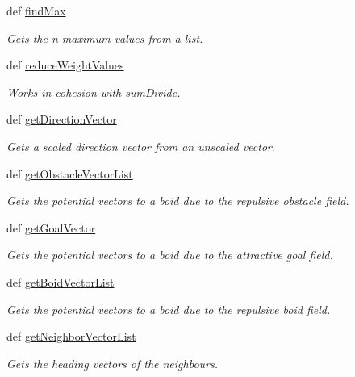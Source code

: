 \begin{DoxyCompactItemize}
def \hyperlink{classboid_1_1Boid_a3467de3698a644a484ff63a3e86f7adc}{find\-Max}
\begin{DoxyCompactList}\small\item\em Gets the n maximum values from a list. \end{DoxyCompactList}\item 
def \hyperlink{classboid_1_1Boid_a2d4f1cded412a333857bb1b8b17d3dd0}{reduce\-Weight\-Values}
\begin{DoxyCompactList}\small\item\em Works in cohesion with sum\-Divide. \end{DoxyCompactList}\item 
def \hyperlink{classboid_1_1Boid_a8aa203db69671a064a623a88dfc6b3b7}{get\-Direction\-Vector}
\begin{DoxyCompactList}\small\item\em Gets a scaled direction vector from an unscaled vector. \end{DoxyCompactList}\item 
def \hyperlink{classboid_1_1Boid_a2c496bdcc16d7db82cc0f730ce3d5264}{get\-Obstacle\-Vector\-List}
\begin{DoxyCompactList}\small\item\em Gets the potential vectors to a boid due to the repulsive obstacle field. \end{DoxyCompactList}\item 
def \hyperlink{classboid_1_1Boid_a47c28705553bd3d729212944880161d3}{get\-Goal\-Vector}
\begin{DoxyCompactList}\small\item\em Gets the potential vectors to a boid due to the attractive goal field. \end{DoxyCompactList}\item 
def \hyperlink{classboid_1_1Boid_a353fbe920fabe58a43affaf183cfcd03}{get\-Boid\-Vector\-List}
\begin{DoxyCompactList}\small\item\em Gets the potential vectors to a boid due to the repulsive boid field. \end{DoxyCompactList}\item 
def \hyperlink{classboid_1_1Boid_aa7ef63f7cc5adfdeb565c56f359b07cd}{get\-Neighbor\-Vector\-List}
\begin{DoxyCompactList}\small\item\em Gets the heading vectors of the neighbours. \end{DoxyCompactList}\item 

\end{DoxyCompactItemize}
